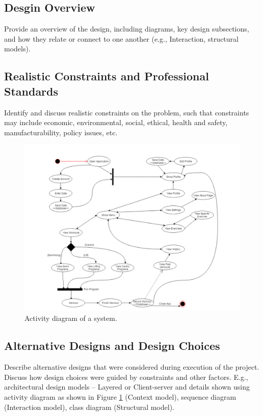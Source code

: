 \documentclass{article}
\begin{document}
\subsection{Desgin Overview}
Provide an overview of the design, including diagrams, key design subsections, and how they relate or connect to one another (e.g., Interaction, structural models).

\subsection{Realistic Constraints and Professional Standards}
Identify and discuss realistic constraints on the problem, such that constraints may include economic, environmental, social, ethical, health and safety, manufacturability, policy issues, etc.

\begin{figure}[!t]\centering
\includegraphics[width=5.0in]{./Figure/ativity.pdf}
\caption{Activity diagram of a system.}\label{fig:act_dia_1}
\end{figure}

\subsection{Alternative Designs and Design Choices}
Describe alternative designs that were considered during execution of the project. Discuss how design choices were guided by constraints and other factors. E.g., architectural design models – Layered or Client-server and details shown using activity diagram as shown in Figure \ref{fig:act_dia_1} (Context model), sequence diagram (Interaction model), class diagram (Structural model).
\end{document}
